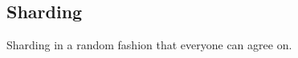 \subsection{Sharding}\label{subsec:usecase_sharding}
Sharding in a random fashion that everyone can agree on.
